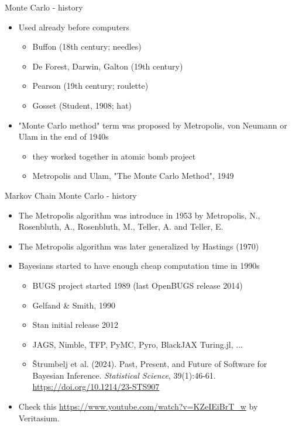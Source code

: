 \documentclass[english,t]{beamer}
\begin{document}
\begin{frame}{Monte Carlo - history}

  \begin{itemize}
  \item Used already before computers
    \begin{itemize}
      \item Buffon (18th century; needles)
      \item De Forest, Darwin, Galton (19th century)
      \item Pearson (19th century; roulette)
      \item Gosset (Student, 1908; hat)
    \end{itemize}
    \pause
  \item "Monte Carlo method" term was proposed by Metropolis, von Neumann
    or Ulam in the end of 1940s
     \begin{itemize}
     \item they worked together in atomic bomb project
     \item Metropolis and Ulam, "The Monte Carlo Method", 1949
     \end{itemize}
  \end{itemize}
\end{frame}


\begin{frame}{Markov Chain Monte Carlo - history}

  \begin{itemize}
  \item The Metropolis algorithm was introduce in 1953 by Metropolis, N., Rosenbluth, A., Rosenbluth, M., Teller, A. and Teller, E.
    \pause
   \item The Metropolis algorithm was later generalized by Hastings (1970)
    \pause
   \item Bayesians started to have enough cheap computation time in 1990s
     \begin{itemize}
     \item BUGS project started 1989 (last OpenBUGS release 2014)
     \item Gelfand \& Smith, 1990
       \pause
     \item Stan initial release 2012
     \item JAGS, Nimble, TFP, PyMC, Pyro, BlackJAX
       Turing.jl, ...
     \item  Štrumbelj et al. (2024). Past, Present, and Future of Software for Bayesian Inference. \textit{Statistical Science}, 39(1):46-61. \url{https://doi.org/10.1214/23-STS907}
     \end{itemize}
     \pause
  \item Check this \url{https://www.youtube.com/watch?v=KZeIEiBrT_w} by Veritasium.
  \end{itemize}
\end{frame}
\end{document}
